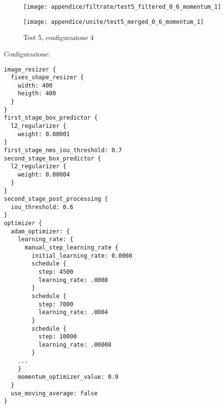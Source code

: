 \newpage
\begin{figure}[H]  
    \begin{minipage}{.5\columnwidth}  
        \centering  
        \texttt{[image: appendice/filtrate/test5\_filtered\_0\_6\_momentum\_1]}  
    \end{minipage}%
    \begin{minipage}{0.5\columnwidth}  
        \centering  
        \texttt{[image: appendice/unite/test5\_merged\_0\_6\_momentum\_1]}  
    \end{minipage}  
    \caption{Test 5, configurazione 4}
\end{figure}%
Configurazione:
\begin{multicols}{2}
    \begin{lstlisting}
image_resizer {
  fixes_shape_resizer {
    width: 400
    heigth: 400
  }
}
first_stage_box_predictor {
  l2_regularizer {
    weight: 0.00001
}
first_stage_nms_iou_threshold: 0.7
second_stage_box_predictor {
  l2_regularizer {
    weight: 0.00004
  }
}
second_stage_post_processing {
  iou_threshold: 0.6
}
optimizer {
  adam_optimizer: {
    learning_rate: {
      manual_step_learning_rate {
        initial_learning_rate: 0.0008
        schedule {
          step: 4500
          learning_rate: .0008
        }
        schedule {
          step: 7000
          learning_rate: .0004
        }
        schedule {
          step: 10000
          learning_rate: .00008
        }
    ...
    }
    momentum_optimizer_value: 0.9
  }
  use_moving_average: false
}
    \end{lstlisting}
\end{multicols}

